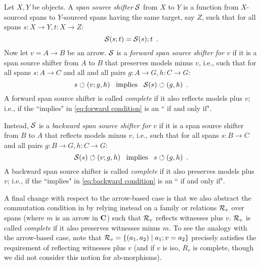 \begin{definition}
Let $X,Y$ be objects. A \emph{span source shifter} $\mathcal{S}$ from $X$ to $Y$ is a function from $X$-sourced spans to $Y$-sourced spans having the same target, say $Z$, such that for all spans $s:X\to Y,t:X\to Z$:
%
\begin{equation}\eqlabel{span shifters are functors}
\cS(s;t) = \cS(s);t \enspace.
\end{equation}
%
Now let $v=A\to B$ be an arrow. $\mathcal{S}$ is a \emph{forward span source shifter for $v$} if it is a span source shifter from $A$ to $B$ that preserves models minus $v$, i.e., such that for all spans $s:A\to C$ and all and all pairs $g:A\to G,h:C \to G$:
%
\begin{equation}\eqlabel{forward condition}
s\commutes (v;g,h) \enspace\text{ implies }\enspace \cS(s) \commutes (g,h) \enspace.
\end{equation}
%
A forward span source shifter is called \emph{complete} if it also reflects models plus $v$; i.e., if the ``implies" in \eqref{eq:forward condition} is an `` if and only if".

Instead, $\mathcal{S}$ is a \emph{backward span source shifter for $v$} if it is a span source shifter from $B$ to $A$ that reflects models minus $v$, i.e., such that for all spans $s:B\to C$ and all pairs $g:B\to G,h:C\to G$:
%
\begin{equation}\eqlabel{backward condition}
\cS(s) \commutes (v;g,h) \enspace\text{ implies }\enspace s\commutes (g,h) \enspace.
\end{equation}
%
A backward span source shifter is called \emph{complete} if it also preserves models plus $v$; i.e., if the ``implies" in \eqref{eq:backward condition} is an `` if and only if".
\end{definition}
%
A final change with respect to the arrow-based case is that we also abstract the commutation condition in  by relying instead on a family or relations $\mathcal{R}_v$ over spans (where $m$ is an arrow in $\mathbf{C}$) such that $\mathcal{R}_v$ reflects witnesses plus $v$. $\mathcal{R}_v$ is called \emph{complete} if it also preserves witnesses minus $m$. To see the analogy with the arrow-based case, note that $\mathcal{R}_v=\{{(a_1,a_2)\mid a_1;v=a_2}\}$ precisely satisfies the requirement of reflecting witnesses plus $v$ (and if $v$ is iso, $R_v$ is complete, though we did not consider this notion for ab-morphisms).
%
